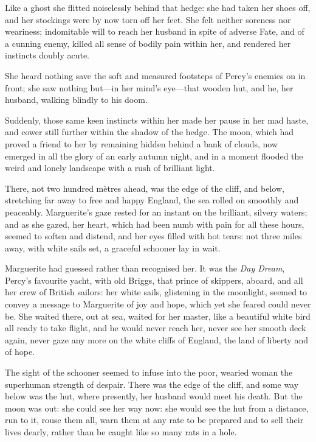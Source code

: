 Like a ghost she flitted noiselessly behind that hedge: she had taken her shoes off, and her stockings were by now torn off her feet. She felt neither soreness nor weariness; indomitable will to reach her husband in spite of adverse Fate, and of a cunning enemy, killed all sense of bodily pain within her, and rendered her instincts doubly acute.

She heard nothing save the soft and measured footsteps of Percy's enemies on in front; she saw nothing but---in her mind's eye---that wooden hut, and he, her husband, walking blindly to his doom.

Suddenly, those same keen instincts within her made her pause in her mad haste, and cower still further within the shadow of the hedge. The moon, which had proved a friend to her by remaining hidden behind a bank of clouds, now emerged in all the glory of an early autumn night, and in a moment flooded the weird and lonely landscape with a rush of brilliant light.

There, not two hundred mètres ahead, was the edge of the cliff, and below, stretching far away to free and happy England, the sea rolled on smoothly and peaceably. Marguerite's gaze rested for an instant on the brilliant, silvery waters; and as she gazed, her heart, which had been numb with pain for all these hours, seemed to soften and distend, and her eyes filled with hot tears: not three miles away, with white sails set, a graceful schooner lay in wait.

Marguerite had guessed rather than recognised her. It was the \textit{Day Dream}, Percy's favourite yacht, with old Briggs, that prince of skippers, aboard, and all her crew of British sailors: her white sails, glistening in the moonlight, seemed to convey a message to Marguerite of joy and hope, which yet she feared could never be. She waited there, out at sea, waited for her master, like a beautiful white bird all ready to take flight, and he would never reach her, never see her smooth deck again, never gaze any more on the white cliffs of England, the land of liberty and of hope.

The sight of the schooner seemed to infuse into the poor, wearied woman the superhuman strength of despair. There was the edge of the cliff, and some way below was the hut, where presently, her husband would meet his death. But the moon was out: she could see her way now: she would see the hut from a distance, run to it, rouse them all, warn them at any rate to be prepared and to sell their lives dearly, rather than be caught like so many rats in a hole.

